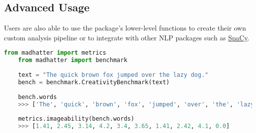\subsection{Advanced Usage}

Users are also able to use the package's lower-level functions to create their own custom analysis pipeline or to integrate with other NLP packages such as \href{https://github.com/explosion/spaCy}{SpaCy}.

\begin{lstlisting}[language=python, breaklines]
    from madhatter import metrics
    from madhatter import benchmark
    
    text = "The quick brown fox jumped over the lazy dog."
    bench = benchmark.CreativityBenchmark(text)
    
    bench.words
    >>> ['The', 'quick', 'brown', 'fox', 'jumped', 'over', 'the', 'lazy', 'dog', '.']
    
    metrics.imageability(bench.words)
    >>> [1.41, 2.45, 3.14, 4.2, 3.4, 3.65, 1.41, 2.42, 4.1, 0.0]
\end{lstlisting}
